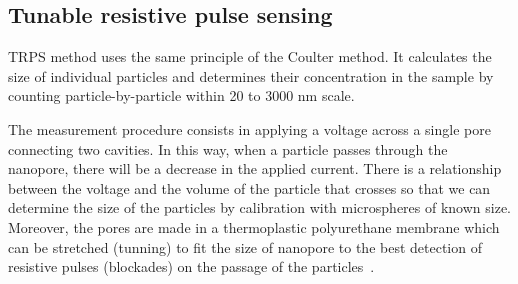 \documentclass[journal=langd5,manuscript=article]{achemso}
\begin{document}

\subsection{Tunable resistive pulse sensing}
TRPS method uses the same principle of the Coulter method. It calculates the size of individual particles and determines their  concentration in the sample by counting particle-by-particle within 20 to 3000 nm scale.


The measurement procedure consists in applying a voltage across a single pore connecting two cavities. In this way, when a particle passes through the nanopore, there will be a decrease in the applied current. There is a relationship between the voltage and the volume of the particle that crosses so that we can determine the size of the particles by calibration with microspheres of known size. Moreover, the pores are made in a  thermoplastic polyurethane membrane which can be stretched (tunning) to fit the size of nanopore to the best detection of  resistive pulses (blockades) on the passage of the particles~\cite{Weatherall2016}.

\end{document}
